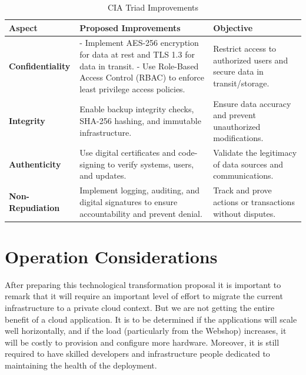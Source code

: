 \documentclass{llncs}
\begin{document}
\begin{table}[tbph]
  \centering
  \begin{tabular}{|p{3cm}|p{5cm}|p{5cm}|}
    \hline
    \textbf{Aspect} & \textbf{Proposed Improvements}                                                                     & \textbf{Objective} \\ \hline
    \textbf{Confidentiality}
                    & - Implement AES-256 encryption for data at rest and TLS 1.3 for data in transit. \newline
    - Use Role-Based Access Control (RBAC) to enforce least privilege access policies. 
                    & Restrict access to authorized users and secure data in transit/storage.                                                 \\ \hline
    \textbf{Integrity}
                    & Enable backup integrity checks, SHA-256 hashing, and immutable infrastructure. 
                    & Ensure data accuracy and prevent unauthorized modifications.                                                            \\ \hline
    \textbf{Authenticity}
                    & Use digital certificates and code-signing to verify systems, users, and updates. 
                    & Validate the legitimacy of data sources and communications.                                                             \\ \hline
    \textbf{Non-Repudiation}
                    & Implement logging, auditing, and digital signatures to ensure accountability and prevent denial. 
                    & Track and prove actions or transactions without disputes.                                                               \\ \hline
  \end{tabular}
  \caption{CIA Triad Improvements}
  \label{tab:cia-triad}
\end{table}

\newpage

\section{Operation Considerations}

After preparing this technological transformation proposal it is important to remark that it will require an important level of effort to migrate the current infrastructure to a private cloud context. But we are not getting the entire benefit of a cloud application. It is to be determined if the applications will scale well horizontally, and if the load (particularly from the Webshop) increases, it will be costly to provision and configure more hardware. Moreover, it is still required to have skilled developers and infrastructure people dedicated to maintaining the health of the deployment.  
\end{document}
